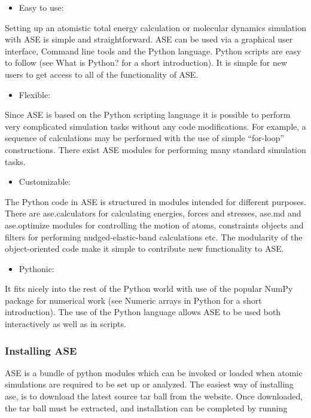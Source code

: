 \documentclass[11pt]{article}
\begin{document}
\begin{itemize}
\item Easy to use:
\end{itemize}
Setting up an atomistic total energy calculation or molecular dynamics simulation with ASE is simple and straightforward. ASE can be used via a graphical user interface, Command line tools and the Python language. Python scripts are easy to follow (see What is Python? for a short introduction). It is simple for new users to get access to all of the functionality of ASE.

\begin{itemize}
\item Flexible:
\end{itemize}
Since ASE is based on the Python scripting language it is possible to perform very complicated simulation tasks without any code modifications. For example, a sequence of calculations may be performed with the use of simple “for-loop” constructions. There exist ASE modules for performing many standard simulation tasks.

\begin{itemize}
\item Customizable:
\end{itemize}
The Python code in ASE is structured in modules intended for different purposes. There are ase.calculators for calculating energies, forces and stresses, ase.md and ase.optimize modules for controlling the motion of atoms, constraints objects and filters for performing nudged-elastic-band calculations etc. The modularity of the object-oriented code make it simple to contribute new functionality to ASE.

\begin{itemize}
\item Pythonic:
\end{itemize}
It fits nicely into the rest of the Python world with use of the popular NumPy package for numerical work (see Numeric arrays in Python for a short introduction). The use of the Python language allows ASE to be used both interactively as well as in scripts.

\subsubsection{Installing ASE}
\label{sec-5-0-1}
ASE is a bundle of python modules which can be invoked or loaded when atomic simulations are required to be set up or analyzed. The easiest way of installing ase, is to download the latest source tar ball from the website. Once downloaded, the tar ball must be extracted, and installation can be completed by running 
\end{document}
